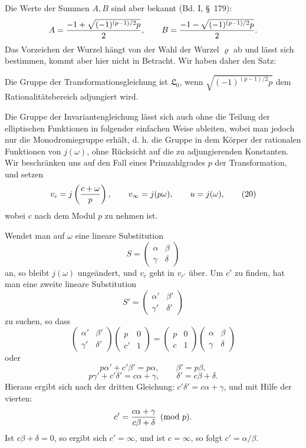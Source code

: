 \documentclass[11pt]{article}
\begin{document}
Die Werte der Summen $A,B$ sind aber bekannt (Bd. I, \S~179):
\[
 A={-1+\sqrt{(-1)^{(p-1)/2}p}\over2},
 \qquad
 B={-1-\sqrt{(-1)^{(p-1)/2}p}\over2}.
\]
Das Vorzeichen der Wurzel hängt von der Wahl der Wurzel $\varrho$ ab und lässt sich bestimmen, kommt aber hier nicht in Betracht. Wir haben daher den Satz:

Die Gruppe der Transformationsgleichung ist $\mathfrak L_0$, wenn $\sqrt{(-1)^{(p-1)/2}p}$ dem Rationalitätsbereich adjungiert wird.

Die Gruppe der Invariantengleichung lässt sich auch ohne die Teilung der elliptischen Funktionen in folgender einfachen Weise ableiten, wobei man jedoch nur die Monodromiegruppe erhält, d. h. die Gruppe in dem Körper der rationalen Funktionen von $j(\omega)$, ohne Rücksicht auf die zu adjungierenden Konstanten. Wir beschränken uns auf den Fall eines Primzahlgrades $p$ der Transformation, und setzen
\begin{equation}
 v_c=j\left({c+\omega\over p}\right),
 \qquad
 v_\infty=j(p\omega),
 \qquad
 u=j(\omega),
\tag{20}
\end{equation}
wobei $c$ nach dem Modul $p$ zu nehmen ist.

Wendet man auf $\omega$ eine lineare Substitution
\[
 S=\begin{pmatrix}\alpha&\beta\\ \gamma&\delta\end{pmatrix}
\]
an, so bleibt $j(\omega)$ ungeändert, und $v_c$ geht in $v_{c'}$ über. Um $c'$ zu finden, hat man eine zweite lineare Substitution
\[
 S'=\begin{pmatrix}\alpha'&\beta'\\ \gamma'&\delta'\end{pmatrix}
\]
zu suchen, so dass
\[
\begin{pmatrix}\alpha'&\beta'\\ \gamma'&\delta'\end{pmatrix}
\begin{pmatrix}p&0\\ c'&1\end{pmatrix}
=
\begin{pmatrix}p&0\\ c&1\end{pmatrix}
\begin{pmatrix}\alpha&\beta\\ \gamma&\delta\end{pmatrix}
\]
oder
\[
 p\alpha'+c'\beta'=p\alpha,
 \qquad
 \beta'=p\beta,
\]
\[
 p\gamma'+c'\delta'=c\alpha+\gamma,
 \qquad
 \delta'=c\beta+\delta.
\]
Hieraus ergibt sich nach der dritten Gleichung: $c'\delta'=c\alpha+\gamma$, und mit Hilfe der vierten:
\[
 c'={c\alpha+\gamma\over c\beta+\delta}\pmod p.
\]
Ist $c\beta+\delta=0$, so ergibt sich $c'=\infty$, und ist $c=\infty$, so folgt $c'=\alpha/\beta$.
\end{document}
